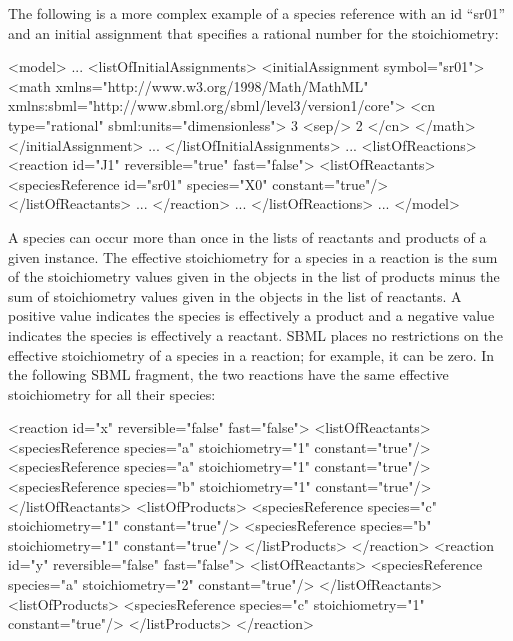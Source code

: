 The following is a more complex example of a species reference with an id ``sr01'' and 
an initial assignment that specifies a rational number for the stoichiometry:


\begin{example}
<model>
    ...
    <listOfInitialAssignments>
        <initialAssignment symbol="sr01">
            <math xmlns="http://www.w3.org/1998/Math/MathML"
                  xmlns:sbml="http://www.sbml.org/sbml/level3/version1/core">
                <cn type="rational" sbml:units="dimensionless"> 3 <sep/> 2 </cn>
            </math>
        </initialAssignment>
        ...
    </listOfInitialAssignments>
	...
    <listOfReactions>
        <reaction id="J1" reversible="true" fast="false">
            <listOfReactants>
                <speciesReference id="sr01" species="X0" constant="true"/>
            </listOfReactants>
            ...
        </reaction>
        ...
    </listOfReactions>
    ...
</model>
\end{example}


A species can occur more than once in the lists of reactants and
products of a given \Reaction instance.  The effective
stoichiometry for a species in a reaction is the sum of the
stoichiometry values given in the \SpeciesReference objects in
the list of products minus the sum of stoichiometry values given
in the \SpeciesReference objects in the list of reactants.  A
positive value indicates the species is effectively a product and
a negative value indicates the species is effectively a reactant.
SBML places no restrictions on the effective stoichiometry of a
species in a reaction; for example, it can be zero.  In the
following SBML fragment, the two reactions have the same effective
stoichiometry for all their species:

\begin{example}
<reaction id="x" reversible="false" fast="false">
    <listOfReactants>
        <speciesReference species="a" stoichiometry="1" constant="true"/>
        <speciesReference species="a" stoichiometry="1" constant="true"/>
        <speciesReference species="b" stoichiometry="1" constant="true"/>
    </listOfReactants>
    <listOfProducts>
        <speciesReference species="c" stoichiometry="1" constant="true"/>
        <speciesReference species="b" stoichiometry="1" constant="true"/>
    </listProducts>
</reaction>
<reaction id="y" reversible="false" fast="false">
    <listOfReactants>
        <speciesReference species="a" stoichiometry="2" constant="true"/>
    </listOfReactants>
    <listOfProducts>
        <speciesReference species="c" stoichiometry="1" constant="true"/>
    </listProducts>
</reaction>
\end{example}



